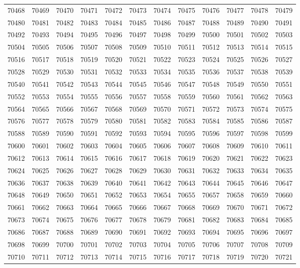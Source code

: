 \begin{center}
\begin{longtable}{llllllllllll}
70468 &70469 &70470 &70471 &70472 &70473 &70474 &70475 &70476 &70477 &70478 &70479 \\
70480 &70481 &70482 &70483 &70484 &70485 &70486 &70487 &70488 &70489 &70490 &70491 \\
70492 &70493 &70494 &70495 &70496 &70497 &70498 &70499 &70500 &70501 &70502 &70503 \\
70504 &70505 &70506 &70507 &70508 &70509 &70510 &70511 &70512 &70513 &70514 &70515 \\
70516 &70517 &70518 &70519 &70520 &70521 &70522 &70523 &70524 &70525 &70526 &70527 \\
70528 &70529 &70530 &70531 &70532 &70533 &70534 &70535 &70536 &70537 &70538 &70539 \\
70540 &70541 &70542 &70543 &70544 &70545 &70546 &70547 &70548 &70549 &70550 &70551 \\
70552 &70553 &70554 &70555 &70556 &70557 &70558 &70559 &70560 &70561 &70562 &70563 \\
70564 &70565 &70566 &70567 &70568 &70569 &70570 &70571 &70572 &70573 &70574 &70575 \\
70576 &70577 &70578 &70579 &70580 &70581 &70582 &70583 &70584 &70585 &70586 &70587 \\
70588 &70589 &70590 &70591 &70592 &70593 &70594 &70595 &70596 &70597 &70598 &70599 \\
70600 &70601 &70602 &70603 &70604 &70605 &70606 &70607 &70608 &70609 &70610 &70611 \\
70612 &70613 &70614 &70615 &70616 &70617 &70618 &70619 &70620 &70621 &70622 &70623 \\
70624 &70625 &70626 &70627 &70628 &70629 &70630 &70631 &70632 &70633 &70634 &70635 \\
70636 &70637 &70638 &70639 &70640 &70641 &70642 &70643 &70644 &70645 &70646 &70647 \\
70648 &70649 &70650 &70651 &70652 &70653 &70654 &70655 &70657 &70658 &70659 &70660 \\
70661 &70662 &70663 &70664 &70665 &70666 &70667 &70668 &70669 &70670 &70671 &70672 \\
70673 &70674 &70675 &70676 &70677 &70678 &70679 &70681 &70682 &70683 &70684 &70685 \\
70686 &70687 &70688 &70689 &70690 &70691 &70692 &70693 &70694 &70695 &70696 &70697 \\
70698 &70699 &70700 &70701 &70702 &70703 &70704 &70705 &70706 &70707 &70708 &70709 \\
70710 &70711 &70712 &70713 &70714 &70715 &70716 &70717 &70718 &70719 &70720 &70721 \\

\end{longtable}
\end{center}

